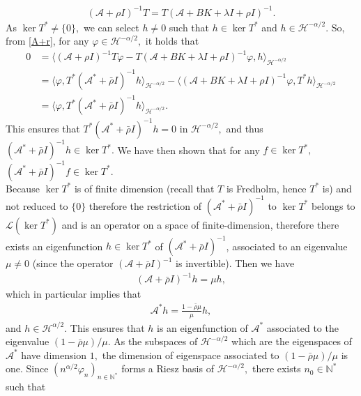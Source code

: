 \documentclass[11pt, dvipsnames]{amsart}
\begin{document}
\begin{itemize}
    \begin{align}
        (\mathcal{A}+\rho I)^{-1}T=T(\mathcal{A}+BK+\lambda I+\rho I)^{-1}.\label{A+r}
    \end{align}
    As $\ker T^*\neq \{0\},$ we can select $h\neq 0$ such that $h\in \ker T^*$ and $h\in \mathcal{H}^{-\alpha/2}.$ So, from \eqref{A+r}, for any $\varphi\in \mathcal{H}^{-\alpha/2},$ it holds that
    \begin{align*}
        0&=\langle (\mathcal{A}+\rho I)^{-1}T\varphi-T(\mathcal{A}+BK+\lambda I+\rho I)^{-1}\varphi,h\rangle_{\mathcal{H}^{-\alpha/2}}\\
        &=\langle \varphi, T^*(\mathcal{A}^*+\bar \rho I)^{-1}h\rangle_{\mathcal{H}^{-\alpha/2}}-\langle (\mathcal{A}+BK+\lambda I+\rho I)^{-1}\varphi,T^*h\rangle_{\mathcal{H}^{-\alpha/2}} \\
        &=\langle \varphi, T^*(\mathcal{A}^*+\bar \rho I)^{-1}h\rangle_{\mathcal{H}^{-\alpha/2}}.
    \end{align*} This ensures that $T^*(\mathcal{A}^*+\bar \rho I)^{-1}h=0$ in $\mathcal{H}^{-\alpha/2},$ and thus $(\mathcal{A}^*+\bar \rho I)^{-1}h\in \ker T^*.$ We have then shown that for any $f\in \ker T^*,$ $(\mathcal{A}^*+\bar \rho I)^{-1}f\in \ker T^*.$\\
    Because $\ker T^*$ is of finite dimension (recall that $T$ is Fredholm, hence $T^*$ is) and not reduced to $\{0\}$ therefore the restriction of $(\mathcal{A}^*+\bar \rho I)^{-1}$ to $\ker T^*$ belongs to $\mathcal{L}(\ker T^*)$ and is an operator on a space of finite-dimension, therefore   
    there exists an eigenfunction $h\in \ker T^*$ of $(\mathcal{A}^*+\bar\rho I)^{-1}$, associated to an eigenvalue $\mu\neq 0$ (since the operator $(\mathcal{A}+\bar \rho I)^{-1}$ is invertible). Then we have
    \begin{align*}
        (\mathcal{A}+\bar \rho I)^{-1}h=\mu h,
    \end{align*} which in particular implies that
    \begin{align}
        \mathcal{A}^*h=\frac{1-\bar \rho \mu}{\mu}h,\label{Eig}
    \end{align} and $h\in \mathcal{H}^{\alpha/2}.$ This ensures that $h$ is an eigenfunction of $\mathcal{A}^*$ associated to the eigenvalue $(1-\bar \rho \mu)/\mu.$
    As the subspaces of $\mathcal{H}^{-\alpha/2}$ which are the  eigenspaces of $\mathcal{A}^*$  have dimension $1,$ the dimension of eigenspace associated to $(1-\bar \rho \mu)/\mu$ is one. Since $(n^{\alpha/2}\varphi_n)_{n\in \mathbb{N}^*}$ forms a Riesz basis of $\mathcal{H}^{-\alpha/2},$ there exists $n_0\in\mathbb{N}^*$ such that

\end{itemize}
\end{document}
